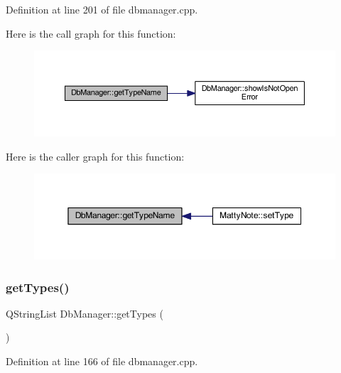 Definition at line 201 of file dbmanager.\+cpp.

Here is the call graph for this function\+:
\nopagebreak
\begin{figure}[H]
\begin{center}
\leavevmode
\includegraphics[width=350pt]{classDbManager_a6cb58e12049873e8b1b4b6ecd74dbfb6_cgraph}
\end{center}
\end{figure}
Here is the caller graph for this function\+:
\nopagebreak
\begin{figure}[H]
\begin{center}
\leavevmode
\includegraphics[width=350pt]{classDbManager_a6cb58e12049873e8b1b4b6ecd74dbfb6_icgraph}
\end{center}
\end{figure}
\hypertarget{classDbManager_ade7585873652935bb12cb1ad546ceba2}{}\label{classDbManager_ade7585873652935bb12cb1ad546ceba2} 
\subsubsection{\texorpdfstring{get\+Types()}{getTypes()}}
{\footnotesize\ttfamily Q\+String\+List Db\+Manager\+::get\+Types (\begin{DoxyParamCaption}{ }\end{DoxyParamCaption})\hspace{0.3cm}{\ttfamily [static]}}



Definition at line 166 of file dbmanager.\+cpp.

